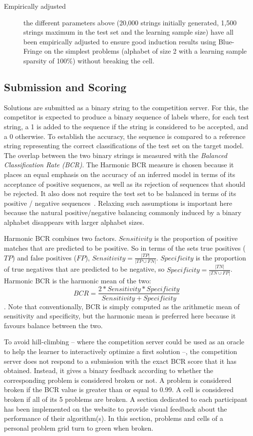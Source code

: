 \begin{description}
\item[Empirically adjusted] the different parameters above (20,000 strings initially generated, 1,500 strings maximum in the test set and the learning sample size) have all been empirically adjusted to ensure good induction results using Blue-Fringe on the simplest problems (alphabet of size 2 with a learning sample sparsity of 100\%) without breaking the cell.

\end{description}

\subsection{Submission and Scoring}

Solutions are submitted as a binary string to the competition server. For this, the competitor is expected to produce a binary sequence of labels where, for each test string, a 1 is added to the sequence if the string is considered to be accepted, and a 0 otherwise. To establish the accuracy, the sequence is compared to a reference string representing the correct classifications of the test set on the target model. The overlap between the two binary strings is measured with the \emph{Balanced Classification Rate (BCR)}. The Harmonic BCR measure is chosen because it places an equal emphasis on the accuracy of an inferred model in terms of its acceptance of positive sequences, as well as its rejection of sequences that should be rejected. It also does not require the test set to be balanced in terms of its positive / negative sequences~\cite{Walkinshaw2008}. Relaxing such assumptions is important here because the natural positive/negative balancing commonly induced by a binary alphabet disappears with larger alphabet sizes.

Harmonic BCR combines two factors. $Sensitivity$ is the proportion of positive matches that are predicted to be positive. So in terms of the sets true positives ($TP$) and false positives ($FP$), $Sensitivity=\frac{|TP|}{|TP \cup FN|}$. $Specificity$ is the proportion of true negatives that are predicted to be negative, so $Specificity=\frac{|TN|}{|TN \cup FP|}$. Harmonic BCR is the harmonic mean of the two: $$BCR=\frac{2*Sensitivity*Specificity}{Sensitivity + Specificity}$$. Note that conventionally, BCR is simply computed as the arithmetic mean of sensitivity and specificity, but the harmonic mean is preferred here because it favours balance between the two.

To avoid hill-climbing -- where the competition server could be used as an oracle to help the learner to interactively optimize a first solution --, the competition server does not respond to a submission with the exact BCR score that it has obtained. Instead, it gives a binary feedback according to whether the corresponding problem is considered broken or not. A problem is considered broken if the BCR value is greater than or equal to 0.99. A cell is considered broken if all of its 5 problems are broken. A section dedicated to each participant has been implemented on the website to provide visual feedback about the performance of their algorithm(s). In this section, problems and cells of a personal problem grid turn to green when broken.

